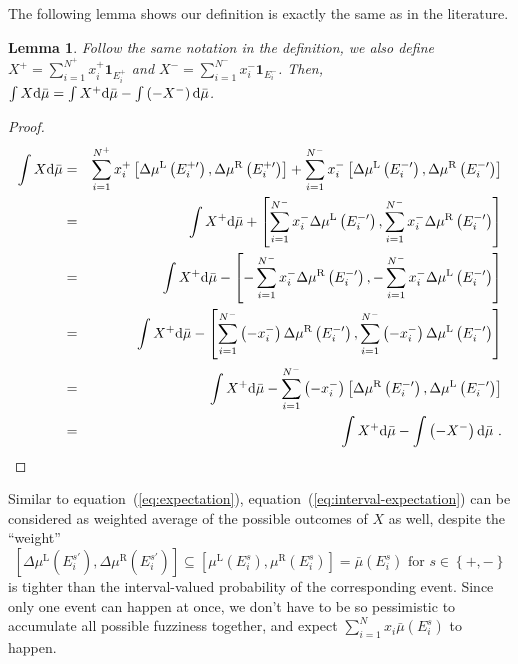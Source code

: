 \documentclass[12pt]{iopart}
\theoremstyle{plain}
\newtheorem{lemma}[thm]{Lemma}
\theoremstyle{definition}
\theoremstyle{remark}
\newcommand{\mul}[1][]{\ensuremath{\mu^{\mathrm{L{#1}}}}}
\newcommand{\mur}[1][]{\ensuremath{\mu^{\mathrm{R{#1}}}}}
\begin{document}
\noindent The following lemma shows our definition is exactly the
same as in the literature.

\begin{lemma}Follow the same notation in the definition, we also
define $X^{+}=\sum_{i=1}^{N^{+}}x_{i}^{+}\mathbf{1}_{E_{i}^{+}}$
and $X^{-}=\sum_{i=1}^{N^{-}}x_{i}^{-}\mathbf{1}_{E_{i}^{-}}$. Then,
$\int X\mathrm{d}\bar{\mu}=\int X^{+}\mathrm{d}\bar{\mu}-\int\left(-X^{-}\right)\mathrm{d}\bar{\mu}$.\end{lemma}

\begin{proof}
\begin{eqnarray*}
\int X\rmd\bar{\mu} & = & \sum_{i=1}^{N^{+}}x_{i}^{+}\left[\Delta\mul\left(E_{i}^{+\prime}\right),\Delta\mur\left(E_{i}^{+\prime}\right)\right]+\sum_{i=1}^{N^{-}}x_{i}^{-}\left[\Delta\mul\left(E_{i}^{-\prime}\right),\Delta\mur\left(E_{i}^{-\prime}\right)\right]\\
 & = & \int X^{+}\rmd\bar{\mu}+\left[\sum_{i=1}^{N^{-}}x_{i}^{-}\Delta\mul\left(E_{i}^{-\prime}\right),\sum_{i=1}^{N^{-}}x_{i}^{-}\Delta\mur\left(E_{i}^{-\prime}\right)\right]\\
 & = & \int X^{+}\rmd\bar{\mu}-\left[-\sum_{i=1}^{N^{-}}x_{i}^{-}\Delta\mur\left(E_{i}^{-\prime}\right),-\sum_{i=1}^{N^{-}}x_{i}^{-}\Delta\mul\left(E_{i}^{-\prime}\right)\right]\\
 & = & \int X^{+}\rmd\bar{\mu}-\left[\sum_{i=1}^{N^{-}}\left(-x_{i}^{-}\right)\Delta\mur\left(E_{i}^{-\prime}\right),\sum_{i=1}^{N^{-}}\left(-x_{i}^{-}\right)\Delta\mul\left(E_{i}^{-\prime}\right)\right]\\
 & = & \int X^{+}\rmd\bar{\mu}-\sum_{i=1}^{N^{-}}\left(-x_{i}^{-}\right)\left[\Delta\mur\left(E_{i}^{-\prime}\right),\Delta\mul\left(E_{i}^{-\prime}\right)\right]\\
 & = & \int X^{+}\rmd\bar{\mu}-\int\left(-X^{-}\right)\rmd\bar{\mu}\textrm{ .}
\end{eqnarray*}
\end{proof}

\noindent Similar to equation~(\ref{eq:expectation}), equation~(\ref{eq:interval-expectation})
can be considered as weighted average of the possible outcomes of
$X$ as well, despite the ``weight''
\begin{equation}
\left[\Delta\mul\left(E_{i}^{s\prime}\right),\Delta\mur\left(E_{i}^{s\prime}\right)\right]\subseteq\left[\mul\left(E_{i}^{s}\right),\mur\left(E_{i}^{s}\right)\right]=\bar{\mu}\left(E_{i}^{s}\right)\textrm{ for }s\in\left\{ +,-\right\} 
\end{equation}
is tighter than the interval-valued probability of the corresponding
event. Since only one event can happen at once, we don't have to be
so pessimistic to accumulate all possible fuzziness together, and
expect $\sum_{i=1}^{N}x_{i}\bar{\mu}\left(E_{i}^{s}\right)$ to happen.
\end{document}
